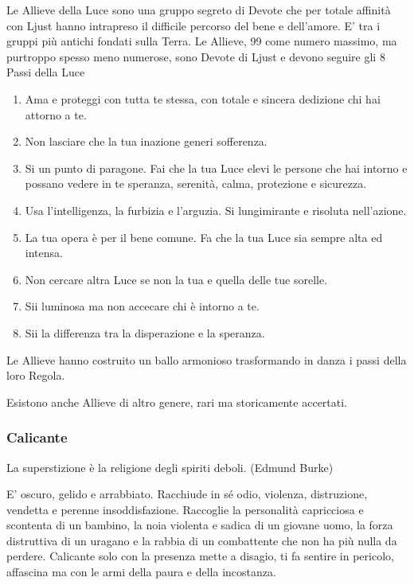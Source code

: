 \begin{multicols}{2}
\medskip

Le Allieve della Luce sono una gruppo segreto di Devote che per totale affinità con Ljust hanno intrapreso il difficile percorso del bene e dell'amore. E' tra i gruppi più antichi fondati sulla Terra. Le Allieve, 99 come numero massimo, ma purtroppo spesso meno numerose, sono Devote di Ljust e devono seguire gli 8 Passi della Luce

\begin{enumerate}[leftmargin=*] \setlength{\itemsep}{0pt}
\item Ama e proteggi con tutta te stessa, con totale e sincera dedizione chi hai attorno a te.
\item Non lasciare che la tua inazione generi sofferenza.
\item Si un punto di paragone. Fai che la tua Luce elevi le persone che hai intorno e possano vedere in te speranza, serenità, calma, protezione e sicurezza.
\item Usa l'intelligenza, la furbizia e l'arguzia. Si lungimirante e risoluta nell'azione.
\item La tua opera è per il bene comune. Fa che la tua Luce sia sempre alta ed intensa.
\item Non cercare altra Luce se non la tua e quella delle tue sorelle.
\item Sii luminosa ma non accecare chi è intorno a te.
\item Sii la differenza tra la disperazione e la speranza.
\end{enumerate}

Le Allieve hanno costruito un ballo armonioso trasformando in danza i passi della loro Regola.

Esistono anche Allieve di altro genere, rari ma storicamente accertati.

\subsubsection{Calicante}\label{calicante}\hypertarget{calicante}{}

\begin{changemargin}{0.3cm}{0.3cm}\begin{enfasi}{
La superstizione è la religione degli spiriti deboli. (Edmund Burke)
}\end{enfasi}\end{changemargin}\medskip

E' oscuro, gelido e arrabbiato. Racchiude in sé odio, violenza, distruzione, vendetta e perenne insoddisfazione. Raccoglie la personalità capricciosa e scontenta di un bambino, la noia violenta e sadica di un giovane uomo, la forza distruttiva di un uragano e la rabbia di un combattente che non ha più nulla da perdere. Calicante solo con la presenza mette a disagio, ti fa sentire in pericolo, affascina ma con le armi della paura e della incostanza.


\end{multicols}
